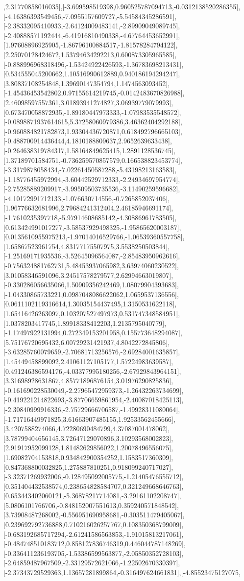 \documentclass{article}
\begin{document}
,2.31770858016035],[-3.699598519398,0.960525787094713,-0.0312138520286355],[-4.16386393549456,-7.0955157609727,-5.54584345286591],[-2.38332095410933,-2.64124009483141,-2.89909049089745],[-2.40888571192444,-6.41916810490338,-4.67764453652991],[1.97608896925905,-1.86796100884517,-1.81578284794122],[2.25070128424672,1.53794634292213,0.600873305965585],[-0.888996968318496,-1.53424922426593,-1.36783698213431],[0.534555045200662,1.10516990612889,0.940186194294247],[3.80837108254848,1.39690147354794,1.1474563093452],[-1.45436453542802,0.97155614219745,-0.0142483670826988],[2.46098597557361,3.01893941274827,3.06939779079993],[0.673470058872935,-1.89180447973333,-1.07983535548572],[-0.0898871937614615,5.37258060979386,3.46362404292188],[-0.960884821782873,1.93304436720871,0.618492796665103],[-0.488700914436444,4.1810188809637,2.9652639633438],[-0.264638319784317,1.58164849625415,1.2891128536745],[1.37189701584751,-0.736259570857579,0.166538823453774],[-3.3179878058434,-7.02261450587288,-5.43198213163583],[-1.18776455972994,-3.60442529712333,-2.24934697954774],[-2.75285889209917,-3.99509503735536,-3.11490259596682],[-4.10172991712133,-1.076630714556,-0.7265852037406],[1.96776632681996,2.79684241312404,2.46185946691174],[-1.7610235397718,-5.97914608685142,-4.30886961783505],[0.613424991017277,-3.58537929498325,-1.95865620003187],[0.0135610955975213,-1.97014016529766,-1.06539360557758],[1.65867523961754,4.83177175507975,3.5538250503844],[-1.25169171935536,-3.52645096564087,-2.85483950962616],[-0.756324881762731,5.48453937065982,3.63974060230522],[3.01058346591096,3.24517578279577,2.62994663019807],[-0.330286056635066,1.50909356242469,1.08079904393683],[-1.04330865733221,0.0987048086622062,1.0659537136556],[0.0611102119316614,1.30035154437495,1.3150531622118],[1.65416426263097,0.103207527497973,0.531747348584951],[1.0378203417745,1.89918338412203,1.2135795040779],[-1.17497922131994,0.272349153201958,0.155773648294087],[5.75176720695432,6.00729231421937,4.8042272845806],[-3.63285760079659,-2.70681713256576,-2.69284001635857],[1.45449458899092,2.41061127105177,1.57224983639587],[0.491246386594176,-4.03377995180256,-2.67929843964151],[3.31698928631867,4.85771896876154,3.01976290825836],[-0.161690228530049,-2.27965472959373,-1.26432263734699],[-0.419221214822693,-3.87706659861954,-2.40087018425113],[-2.30840999916336,-2.75729666706587,-1.49928311080064],[-1.71716449971825,3.61663907485155,1.92533562455666],[3.4207588274066,4.72280690484799,4.37087001478062],[3.78799404656145,3.72647129070896,3.10293568002823],[2.91917952099128,1.81482629856022,1.20078496556075],[1.69082704153818,0.934842900354252,1.1583517360309],[0.847368800032825,1.275887810251,0.918099240717027],[-3.32371269932006,-0.128495092005775,-1.21405476555712],[0.351404432538574,0.238654828584707,0.321249668646763],[0.653443402060121,-5.36878217714081,-3.29161102208747],[5.0806101766706,-0.848152007551613,0.359240571848542],[3.73908487268002,-0.556951690958681,-0.303511479405067],[0.239692792736888,0.710216026257767,0.108350368799009],[-0.683192685717294,-2.61241586563853,-1.91015813217061],[-0.484748510183712,0.858127836746319,0.446044787148269],[-0.336411236193705,-1.53386599563877,-2.05850352728103],[-2.64859487967509,-2.33129572621066,-1.22502670330397],[-2.37343729529363,1.13657281899864,-0.316497624661831],[-4.85523475127075,
\end{document}
